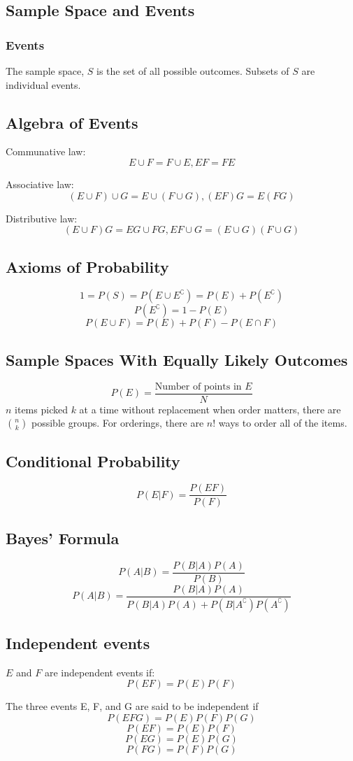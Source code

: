 \subsection{Sample Space and Events}
\subsubsection{Events}
\begin{defi}
  The sample space, $S$ is the set of all possible outcomes.
  Subsets of $S$ are individual events.
\end{defi}
\subsection{Algebra of Events}
Communative law: $$E\cup F = F\cup E, EF=FE$$

Associative law: $$(E \cup F) \cup G = E \cup (F \cup G), (EF)G=E(FG)$$

Distributive law: $$(E\cup F)G = EG\cup FG, EF\cup G = (E\cup G)(F\cup G)$$

\subsection{Axioms of Probability}
\begin{prop}
$$1 = P(S) = P(E \cup E^\complement ) = P(E) + P(E^\complement)$$
$$P(E^\complement) = 1 - P(E)$$
$$P(E \cup F) = P(E) + P(F) - P(E\cap F)$$
\end{prop}

\subsection{Sample Spaces With Equally Likely Outcomes}
$$P(E) = \frac{\text{Number of points in }E}{N}$$
$n$ items picked $k$ at a time without replacement when order matters, there are $\binom{n}{k}$ possible groups.
For orderings, there are $n!$ ways to order all of the items.

\subsection{Conditional Probability}
$$P(E|F) = \frac{P(EF)}{P(F)}$$

\subsection{Bayes' Formula}
$$P(A|B) = \frac{P(B|A)P(A)}{P(B)}$$
$$P(A|B) = \frac{P(B|A)P(A)}{P(B|A)P(A)+P(B|A^\complement)P(A^\complement)}$$

\subsection{Independent events}
\begin{defi}
  $E$ and $F$ are independent events if:
  $$P(EF) = P(E)P(F)$$
\end{defi}
\begin{defi}
The three events E, F, and G are said to be independent if
$$P(EFG) = P(E)P(F)P(G)$$
$$P(EF) = P(E)P(F)$$
$$P(EG) = P(E)P(G)$$
$$P(FG) = P(F)P(G)$$
\end{defi}
